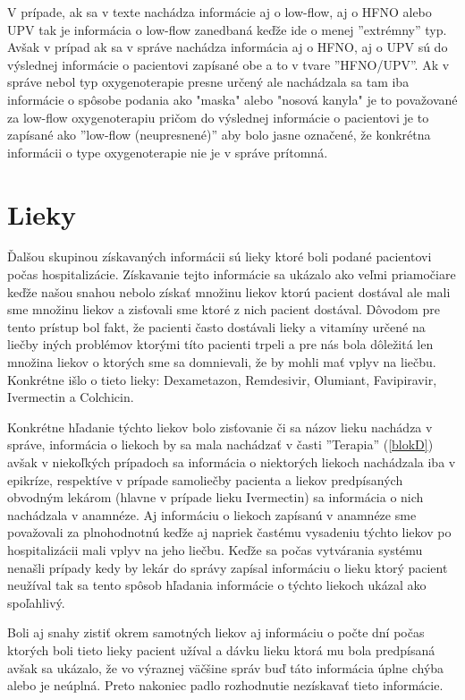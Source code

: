 V prípade, ak sa v texte nachádza informácie aj o low-flow, aj o HFNO alebo UPV tak je informácia o low-flow zanedbaná keďže ide o menej ''extrémny'' typ. Avšak v prípad ak sa v správe nachádza informácia aj o HFNO, aj o UPV sú do výslednej informácie o pacientovi zapísané obe a to v tvare ''HFNO/UPV''. Ak v správe nebol typ oxygenoterapie presne určený ale nachádzala sa tam iba informácie o spôsobe podania ako "maska" alebo "nosová kanyla" je to považované za low-flow oxygenoterapiu pričom do výslednej informácie o pacientovi je to zapísané ako ''low-flow (neupresnené)'' aby bolo jasne označené, že konkrétna informácii o type oxygenoterapie nie je v správe prítomná.

\section{Lieky}

Ďalšou skupinou získavaných informácii sú lieky ktoré boli podané pacientovi počas hospitalizácie. Získavanie tejto informácie sa ukázalo ako veľmi priamočiare keďže našou snahou nebolo získať množinu liekov ktorú pacient dostával ale mali sme množinu liekov a zisťovali sme ktoré z nich pacient dostával. Dôvodom pre tento prístup bol fakt, že pacienti často dostávali lieky a vitamíny určené na liečby iných problémov ktorými títo pacienti trpeli a pre nás bola dôležitá len množina liekov o ktorých sme sa domnievali, že by mohli mať vplyv na liečbu. Konkrétne išlo o tieto lieky: Dexametazon, Remdesivir, Olumiant, Favipiravir, Ivermectin a Colchicin.

Konkrétne hľadanie týchto liekov bolo zisťovanie či sa názov lieku nachádza v správe, informácia o liekoch by sa mala nachádzať v časti ''Terapia'' (\ref{blokD}) avšak v niekoľkých prípadoch sa informácia o niektorých liekoch nachádzala iba v epikríze, respektíve v prípade samoliečby pacienta a liekov predpísaných obvodným lekárom (hlavne v prípade lieku Ivermectin) sa informácia o nich nachádzala v anamnéze. Aj informáciu o liekoch zapísanú v anamnéze sme považovali za plnohodnotnú keďže aj napriek častému vysadeniu týchto liekov po hospitalizácii mali vplyv na jeho liečbu. Keďže sa počas vytvárania systému nenašli prípady kedy by lekár do správy zapísal informáciu o lieku ktorý pacient neužíval tak sa tento spôsob hľadania informácie o týchto liekoch ukázal ako spoľahlivý.
 
Boli aj snahy zistiť okrem samotných liekov aj informáciu o počte dní počas ktorých boli tieto lieky pacient užíval a dávku lieku ktorá mu bola predpísaná avšak sa ukázalo, že vo výraznej väčšine správ buď táto informácia úplne chýba alebo je neúplná. Preto nakoniec padlo rozhodnutie nezískavať tieto informácie.

